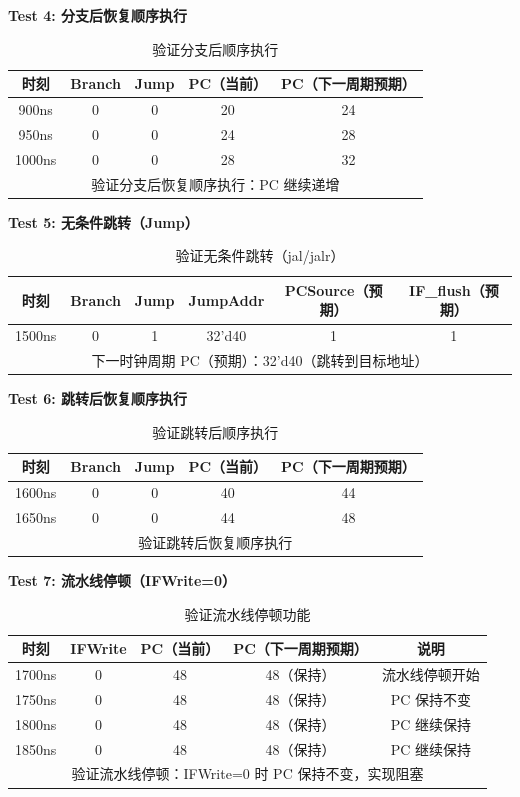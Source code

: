 \documentclass[12pt,a4paper]{article}
\begin{document}
\textbf{Test 4: 分支后恢复顺序执行}

\begin{table}[H]
\centering
\begin{tabular}{|c|c|c|c|c|}
\hline
时刻 & Branch & Jump & PC（当前） & PC（下一周期预期） \\ \hline
900ns & 0 & 0 & 20 & 24 \\ \hline
950ns & 0 & 0 & 24 & 28 \\ \hline
1000ns & 0 & 0 & 28 & 32 \\ \hline
\multicolumn{5}{|c|}{验证分支后恢复顺序执行：PC 继续递增} \\ \hline
\end{tabular}
\caption{验证分支后顺序执行}
\end{table}

\textbf{Test 5: 无条件跳转（Jump）}

\begin{table}[H]
\centering
\begin{tabular}{|c|c|c|c|c|c|}
\hline
时刻 & Branch & Jump & JumpAddr & PCSource（预期） & IF\_flush（预期） \\ \hline
1500ns & 0 & 1 & 32'd40 & 1 & 1 \\ \hline
\multicolumn{6}{|c|}{下一时钟周期 PC（预期）：32'd40（跳转到目标地址）} \\ \hline
\end{tabular}
\caption{验证无条件跳转（jal/jalr）}
\end{table}

\textbf{Test 6: 跳转后恢复顺序执行}

\begin{table}[H]
\centering
\begin{tabular}{|c|c|c|c|c|}
\hline
时刻 & Branch & Jump & PC（当前） & PC（下一周期预期） \\ \hline
1600ns & 0 & 0 & 40 & 44 \\ \hline
1650ns & 0 & 0 & 44 & 48 \\ \hline
\multicolumn{5}{|c|}{验证跳转后恢复顺序执行} \\ \hline
\end{tabular}
\caption{验证跳转后顺序执行}
\end{table}

\textbf{Test 7: 流水线停顿（IFWrite=0）}

\begin{table}[H]
\centering
\begin{tabular}{|c|c|c|c|c|}
\hline
时刻 & IFWrite & PC（当前） & PC（下一周期预期） & 说明 \\ \hline
1700ns & 0 & 48 & 48（保持） & 流水线停顿开始 \\ \hline
1750ns & 0 & 48 & 48（保持） & PC 保持不变 \\ \hline
1800ns & 0 & 48 & 48（保持） & PC 继续保持 \\ \hline
1850ns & 0 & 48 & 48（保持） & PC 继续保持 \\ \hline
\multicolumn{5}{|c|}{验证流水线停顿：IFWrite=0 时 PC 保持不变，实现阻塞} \\ \hline
\end{tabular}
\caption{验证流水线停顿功能}
\end{table}
\end{document}
